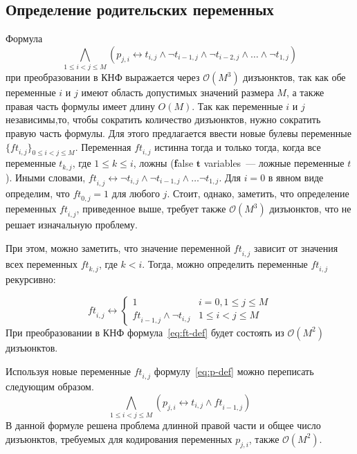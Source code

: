 \subsection{Определение родительских переменных}
\label{sec:space:tight:p-def}

Формула 
\begin{equation*}
\bigwedge_{1 \leq i < j \leq M} \left(p_{j,i} \leftrightarrow t_{i,j} \wedge \neg t_{i - 1,j} \wedge \neg t_{i - 2, j} \wedge \ldots \wedge \neg t_{1,j}\right)
\end{equation*}
при преобразовании в КНФ выражается через $\mathcal{O}\left(M^{3}\right)$ дизъюнктов, так как обе переменные $i$ и $j$ имеют область допустимых значений размера $M$, а также правая часть формулы имеет длину $O\left(M\right)$.
Так как переменные $i$ и $j$ независимы,то, чтобы сократить количество дизъюнктов, нужно сократить правую часть формулы.
Для этого предлагается ввести новые булевы переменные $\{\mathit{ft}_{i,j}\}_{0 \leq i < j \leq M}$.
Переменная $\mathit{ft}_{i,j}$ истинна тогда и только тогда, когда все переменные $t_{k,j}$, где $1 \leq k \leq i$, ложны (\textbf{f}alse $\boldsymbol{t}$ variables~{---} ложные переменные $t$).
Иными словами, $\mathit{ft}_{i,j} \leftrightarrow \neg t_{i,j} \wedge \neg t_{i - 1, j} \wedge \ldots \neg t_{1,j}$. 
Для $i = 0$ в явном виде определим, что $\mathit{ft}_{0,j} = 1$ для любого $j$.
Стоит, однако, заметить, что определение переменных $\mathit{ft}_{i,j}$, приведенное выше, требует также $\mathcal{O}\left(M^3\right)$ дизъюнктов, что не решает изначальную проблему.

При этом, можно заметить, что значение переменной $\mathit{ft}_{i,j}$ зависит от значения всех переменных $\mathit{ft}_{k,j}$, где $k < i$. Тогда, можно определить переменные $\mathit{ft}_{i,j}$ рекурсивно:

\begin{equation}
\label{eq:ft-def}
  \mathit{ft}_{i,j} \leftrightarrow 
    \begin{cases} 
      1                               & i = 0, 1 \leq j \leq M \\
      \mathit{ft}_{i-1,j} \wedge \neg t_{i,j}  & 1 \leq i < j \leq M
    \end{cases} 
\end{equation}
%
При преобразовании в КНФ формула~\eqref{eq:ft-def} будет состоять из $\mathcal{O}\left(M^{2}\right)$ дизъюнктов.

Используя новые переменные $\mathit{ft}_{i,j}$ формулу~\eqref{eq:p-def} можно переписать следующим образом.
%
\begin{equation}
\label{eq:p-def-tight}
  \bigwedge_{1 \leq i < j \leq M} \left(p_{j,i} \leftrightarrow t_{i,j} \wedge \mathit{ft}_{i-1,j}\right)
\end{equation}
%
В данной формуле решена проблема длинной правой части и общее число дизъюнктов, требуемых для кодирования переменных $p_{j,i}$, также $\mathcal{O}\left(M^{2}\right)$. 

